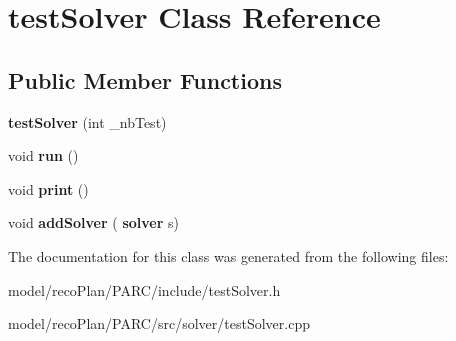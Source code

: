 \section{test\+Solver Class Reference}
\label{classtest_solver}
\subsection*{Public Member Functions}
\begin{DoxyCompactItemize}
\item 
\mbox{\label{classtest_solver_a21b06892128ecd5ad11ec6bb6f4a5858}} 
{\bfseries test\+Solver} (int \+\_\+nb\+Test)
\item 
\mbox{\label{classtest_solver_aa9db0184fafc3f4ff962bfecdfb2d500}} 
void {\bfseries run} ()
\item 
\mbox{\label{classtest_solver_a9e0f0753e7d3a309da94fdb989046b3f}} 
void {\bfseries print} ()
\item 
\mbox{\label{classtest_solver_abb53fb745e83c43a7fb0bf0dba7310df}} 
void {\bfseries add\+Solver} (\textbf{ solver} s)
\end{DoxyCompactItemize}


The documentation for this class was generated from the following files\+:\begin{DoxyCompactItemize}
\item 
model/reco\+Plan/\+P\+A\+R\+C/include/test\+Solver.\+h\item 
model/reco\+Plan/\+P\+A\+R\+C/src/solver/test\+Solver.\+cpp\end{DoxyCompactItemize}
